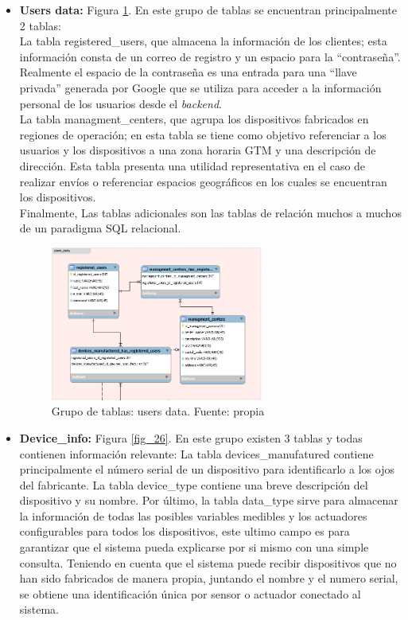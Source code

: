 \begin{itemize}
	
	\item \textbf{Users data:} Figura \ref{fig_25}. En este grupo de tablas se encuentran principalmente 2 tablas:
	\vspace{0.5cm}\\
	La tabla registered\_users, que almacena la información de los clientes; esta información consta de un correo de registro y un espacio para la ``contraseña''. Realmente el espacio de la contraseña es una entrada para una ``llave privada'' generada por Google que se utiliza para acceder a la información personal de los usuarios desde el \textit{backend}.
	\vspace{0.5cm}\\
	La tabla managment\_centers, que agrupa los dispositivos fabricados en regiones de operación; en esta tabla se tiene como objetivo referenciar a los usuarios y los dispositivos a una zona horaria GTM y una descripción de dirección. Esta tabla presenta una utilidad representativa en el caso de realizar envíos o referenciar espacios geográficos en los cuales se encuentran los dispositivos.
	\vspace{0.5cm}\\
	Finalmente, Las tablas adicionales son las tablas de relación muchos a muchos de un paradigma SQL relacional.
	
	\begin{figure}[htbp]
		\centerline{\includegraphics[width=7cm]{figuras/users_data.png}}
		\caption{Grupo de tablas: users data. Fuente: propia}
		\label{fig_25}
	\end{figure}
	
	\item \textbf{Device\_info:} Figura \ref{fig_26}. En este grupo existen 3 tablas y todas contienen información relevante: La tabla devices\_manufatured contiene principalmente el número serial de un dispositivo para identificarlo a los ojos del fabricante. La tabla device\_type contiene una breve descripción del dispositivo y su nombre. Por último, la tabla  data\_type sirve para almacenar la información de todas las posibles variables medibles y los actuadores configurables para todos los dispositivos, este ultimo campo es para garantizar que el sistema pueda explicarse por si mismo con una simple consulta. Teniendo en cuenta que el sistema puede recibir dispositivos que no han sido fabricados de manera propia, juntando el nombre y el numero serial, se obtiene una identificación única por sensor o actuador conectado al sistema. 
	

\end{itemize}
